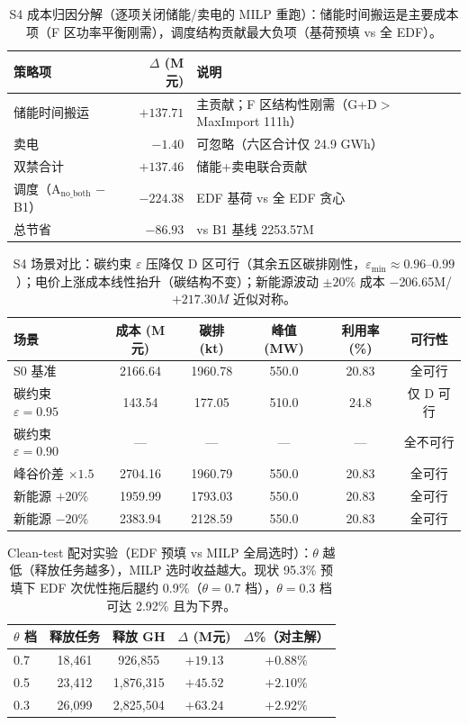 \begin{table}[h]
\centering
\footnotesize
\begin{tabular}{lrl}
\toprule
策略项 & $\Delta$ (M元) & 说明 \\
\midrule
储能时间搬运 & $+137.71$ & 主贡献；F 区结构性刚需（G+D$>$MaxImport 111h） \\
卖电 & $-1.40$ & 可忽略（六区合计仅 24.9 GWh） \\
双禁合计 & $+137.46$ & 储能+卖电联合贡献 \\
调度（A$_{\text{no\_both}}$ $-$ B1） & $-224.38$ & EDF 基荷 vs 全 EDF 贪心 \\
\midrule
总节省 & $-86.93$ & vs B1 基线 2253.57M \\
\bottomrule
\end{tabular}
\caption{S4 成本归因分解（逐项关闭储能/卖电的 MILP 重跑）：储能时间搬运是主要成本项（F 区功率平衡刚需），调度结构贡献最大负项（基荷预填 vs 全 EDF）。}
\label{tab:s4-decomposition}
\end{table}

\begin{table}[h]
\centering
\footnotesize
\begin{tabular}{lccccc}
\toprule
场景 & 成本 (M元) & 碳排 (kt) & 峰值 (MW) & 利用率 (\%) & 可行性 \\
\midrule
S0 基准 & 2166.64 & 1960.78 & 550.0 & 20.83 & 全可行 \\
碳约束 $\varepsilon=0.95$ & 143.54 & 177.05 & 510.0 & 24.8 & 仅 D 可行 \\
碳约束 $\varepsilon=0.90$ & --- & --- & --- & --- & 全不可行 \\
峰谷价差 $\times1.5$ & 2704.16 & 1960.79 & 550.0 & 20.83 & 全可行 \\
新能源 $+20\%$ & 1959.99 & 1793.03 & 550.0 & 20.83 & 全可行 \\
新能源 $-20\%$ & 2383.94 & 2128.59 & 550.0 & 20.83 & 全可行 \\
\bottomrule
\end{tabular}
\caption{S4 场景对比：碳约束 $\varepsilon$ 压降仅 D 区可行（其余五区碳排刚性，$\varepsilon_{\min}\approx0.96$--$0.99$）；电价上涨成本线性抬升（碳结构不变）；新能源波动 $\pm20\%$ 成本 $-$206.65M/$+217.30M$ 近似对称。}
\label{tab:s4-scenario}
\end{table}

\begin{table}[h]
\centering
\footnotesize
\begin{tabular}{lcccc}
\toprule
$\theta$ 档 & 释放任务 & 释放 GH & $\Delta$ (M元) & $\Delta$\%（对主解） \\
\midrule
0.7 & 18,461 & 926,855 & $+19.13$ & $+0.88\%$ \\
0.5 & 23,412 & 1,876,315 & $+45.52$ & $+2.10\%$ \\
0.3 & 26,099 & 2,825,504 & $+63.24$ & $+2.92\%$ \\
\bottomrule
\end{tabular}
\caption{Clean-test 配对实验（EDF 预填 vs MILP 全局选时）：$\theta$ 越低（释放任务越多），MILP 选时收益越大。现状 95.3\% 预填下 EDF 次优性拖后腿约 0.9\%（$\theta=0.7$ 档），$\theta=0.3$ 档可达 2.92\% 且为下界。}
\label{tab:s4-clean}
\end{table}

